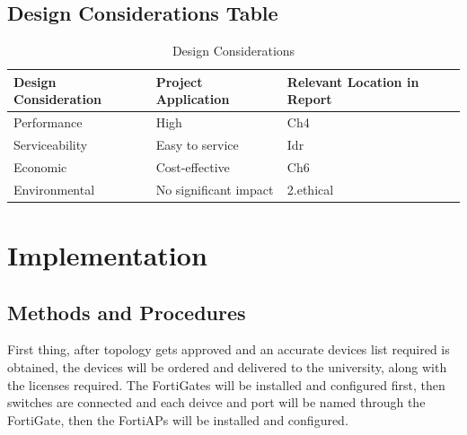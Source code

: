 \documentclass[12pt]{report}
\begin{document}
\section{Design Considerations Table}
\begin{table}[h]
    \centering
    \begin{tabular}{|>{\centering\arraybackslash}m{5cm}|>{\centering\arraybackslash}m{5cm}|>{\centering\arraybackslash}m{5cm}|}
        \hline
        \textbf{Design Consideration} & \textbf{Project Application} & \textbf{Relevant Location in Report} \\
        \hline
        Performance & High & Ch4 \\
        \hline
        Serviceability & Easy to service & Idr \\
        \hline
        Economic & Cost-effective & Ch6 \\
        \hline
        Environmental & No significant impact & 2.ethical \\
        \hline
    \end{tabular}
    \caption{Design Considerations}
    \label{tab:design_considerations}
\end{table}
\chapter{Implementation}
\section{Methods and Procedures}
First thing, after topology gets approved and an accurate devices list required is obtained, the devices will be ordered and delivered to the university, along with the licenses required. The FortiGates will be installed and configured first, then switches are connected and each deivce and port will be named through the FortiGate, then the FortiAPs will be installed and configured.
\end{document}
